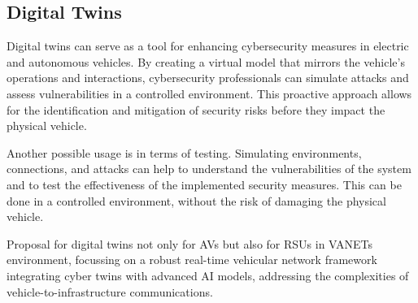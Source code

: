 \subsection{Digital Twins}\label{subsec:digital-twins}
Digital twins can serve as a tool for enhancing cybersecurity measures in electric and autonomous vehicles.
By creating a virtual model that mirrors the vehicle's operations and interactions,
cybersecurity professionals can simulate attacks and assess vulnerabilities in a controlled environment.
This proactive approach allows for the identification and mitigation of security risks
before they impact the physical vehicle\cite{ali2023review}.

Another possible usage is in terms of testing.
Simulating environments, connections,
and attacks can help to understand the vulnerabilities of the system
and to test the effectiveness of the implemented security measures.
This can be done in a controlled environment, without the risk of damaging the physical vehicle.\cite{yigit2024cyber}

Proposal for digital twins not only for AVs but also for RSUs in VANETs environment,
focussing on a robust real-time vehicular network framework integrating cyber twins with advanced AI models,
addressing the complexities of vehicle-to-infrastructure communications\cite{yigit2024cyber}.